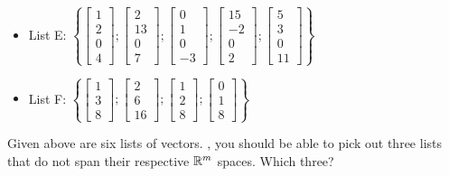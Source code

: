 \begin{itemize}
\item
List E: $\left\{ \left[ \begin{array}{c} 1 \\ 2 \\ 0 \\ 4\end{array} \right] ; 
\left[ \begin{array}{c} 2 \\ 13 \\ 0 \\ 7\end{array} \right] ; 
\left[ \begin{array}{c} 0 \\ 1 \\ 0 \\ -3\end{array} \right] ; 
\left[ \begin{array}{c} 15 \\ -2 \\ 0 \\ 2\end{array} \right] ; 
\left[ \begin{array}{c} 5 \\ 3 \\ 0 \\ 11\end{array} \right]  \right\}$



\item
List F: $\left\{ \left[ \begin{array}{c} 1 \\ 3 \\ 8 \end{array} \right] ; 
\left[ \begin{array}{c} 2 \\ 6 \\ 16 \end{array} \right] ;
\left[ \begin{array}{c} 1 \\ 2 \\ 8 \end{array} \right] ; 
\left[ \begin{array}{c} 0 \\ 1 \\ 8 \end{array} \right] \right\} $
\end{itemize}

Given above are six lists of vectors.  {}, you should be able to pick out three lists
that do not span their respective $\mathbb R^m$ spaces.  Which three?  



